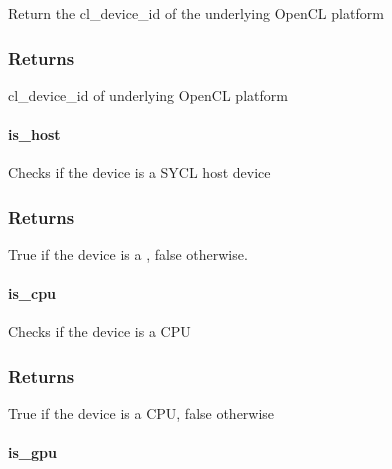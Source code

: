 \documentclass[letterpaper,10pt,english]{sphinxmanual}
\begin{document}
Return the cl\_device\_id of the underlying OpenCL platform
\subsubsection*{Returns}

cl\_device\_id of underlying OpenCL platform


\paragraph{is\_host}
\label{\detokenize{programming-interface/runtime/device:is-host}}
\begin{sphinxVerbatim}[commandchars=\\\{\}]
  
\end{sphinxVerbatim}

Checks if the device is a SYCL host device
\subsubsection*{Returns}

True if the device is a {\hyperref[\detokenize{glossary:term-host-device}]{}}, false otherwise.


\paragraph{is\_cpu}
\label{\detokenize{programming-interface/runtime/device:is-cpu}}
\begin{sphinxVerbatim}[commandchars=\\\{\}]
  
\end{sphinxVerbatim}

Checks if the device is a CPU
\subsubsection*{Returns}

True if the device is a CPU, false otherwise


\paragraph{is\_gpu}
\label{\detokenize{programming-interface/runtime/device:is-gpu}}
\begin{sphinxVerbatim}[commandchars=\\\{\}]
  
\end{sphinxVerbatim}
\end{document}
